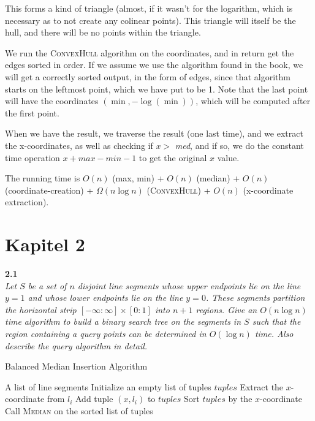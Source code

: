 This forms a kind of triangle (almost, if it wasn't for the logarithm, which is necessary as to not create any colinear points). This triangle will itself be the hull, and there will be no points within the triangle.

We run the \textsc{ConvexHull} algorithm on the coordinates, and in return get the edges sorted in order. If we assume we use the algorithm found in the book, we will get a correctly sorted output, in the form of edges, since that algorithm starts on the leftmost point, which we have put to be 1. Note that the last point will have the coordinates $(\min, -\log(\min))$, which will be computed after the first point.

When we have the result, we traverse the result (one last time), and we extract the x-coordinates, as well as checking if $x > $ \textit{med}, and if so, we do the constant time operation $x + max - min - 1$ to get the original $x$ value.

The running time is $O(n)$ (max, min) + $O(n)$ (median) + $O(n)$ (coordinate-creation) + $\Omega (n \log n)$ (\textsc{ConvexHull}) + $O(n)$ (x-coordinate extraction).

\section{Kapitel 2}
\noindent
\textbf{2.1}\\
\noindent
\textit{Let $S$ be a set of $n$ disjoint line segments whose upper endpoints lie on the line $y = 1$ and whose lower endpoints lie on the line $y = 0$. These segments partition the horizontal strip $[-\infty : \infty] \times [0 : 1]$ into $n+1$ regions. Give an $O(n \log n)$ time algorithm to build a binary search tree on the segments in $S$ such that the region containing a query points can be determined in $O(\log n)$ time. Also describe the query algorithm in detail.}


\begin{algorithm}
	\label{alg:balancedbinarytree}
	\caption{Balanced Median Insertion Algorithm}
	\begin{algorithmic}[1]
		\REQUIRE A list of line segments
		\STATE Initialize an empty list of tuples $\textit{tuples}$
		\STATE Extract the $x$-coordinate from $l_i$
		\STATE Add tuple $(x, l_i)$ to $\textit{tuples}$
		\ENDFOR
		\STATE Sort $\textit{tuples}$ by the $x$-coordinate
		\STATE Call \textsc{Median} on the sorted list of tuples
	\end{algorithmic}
\end{algorithm}

